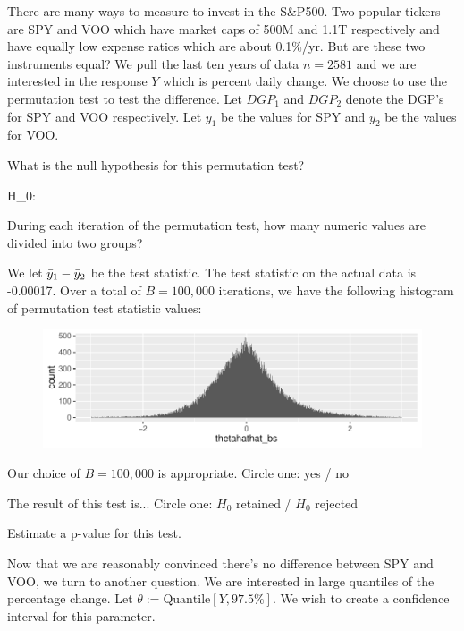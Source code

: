 \documentclass[12pt]{article}
\begin{document}
\problem There are many ways to measure to invest in the S\&P500. Two popular tickers are SPY and VOO which have market caps of 500M and 1.1T respectively and have equally low expense ratios which are about 0.1\%/yr. But are these two instruments equal? We pull the last ten years of data $n = 2581$ and we are interested in the response $Y$ which is percent daily change. We choose to use the permutation test to test the difference. Let $DGP_1$ and $DGP_2$ denote the DGP's for SPY and VOO respectively. Let $y_1$ be the values for SPY and $y_2$ be the values for VOO. 

\begin{enumerate}[(a)]
 What is the null hypothesis for this permutation test?

\beqn
H_0:  \hspace{6in}
\eeqn

 During each iteration of the permutation test, how many numeric values are divided into two groups? 

We let $\bar{y}_{1} - \bar{y}_{2}$ be the test statistic. The test statistic on the actual data is -0.00017. Over a total of $B = 100,000$ iterations, we have the following histogram of permutation test statistic values:

\vspace{-0.2cm}
\begin{figure}[htp]
\centering
\includegraphics[width=6.0in]{perms}
\end{figure}
\FloatBarrier
\vspace{-0.7cm}

 Our choice of $B = 100,000$ is appropriate. Circle one: yes / no 

 The result of this test is... Circle one: $H_0$ retained / $H_0$ rejected 

 Estimate a p-value for this test. 

Now that we are reasonably convinced there's no difference between SPY and VOO, we turn to another question. We are interested in large quantiles of the percentage change. Let $\theta := \text{Quantile}[Y, 97.5\%]$. We wish to create a confidence interval for this parameter.


\end{enumerate}
\end{document}
